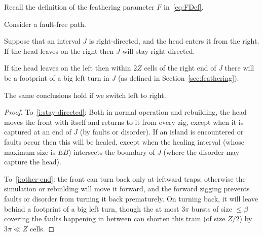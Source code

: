\documentclass[11pt]{memoir}
\theoremstyle{definition} %
\renewcommand{\le}{\leq}
\def\B{B}
\newcommand{\E}{E} %
\newcommand{\F}{F}
\newcommand{\passno}{\pi}
\newcommand{\Z}{Z} %
\begin{document}
Recall the definition of the feathering parameter \( \F \) in~\eqref{eq:FDef}.

\begin{lemma}\label{lem:keep-directed}
  Consider a fault-free path.
  \begin{alphenum}
  \item\label{i:stay-directed}
    Suppose that an interval \( J \) is right-directed, and the head enters it from the right.
    If the head leaves on the right then \( J \) will stay right-directed. 
  \item\label{i:other-end}  If the head leaves on the left then within \( 2\Z \) cells of the right end
    of \( J \) there will be a footprint of a big left turn in \( J \) (as defined in Section~\ref{sec:feathering}).
  \end{alphenum}
  The same conclusions hold if we switch left to right.
\end{lemma}
\begin{proof}
  To~\eqref{i:stay-directed}: Both in normal operation and rebuilding,
  the head moves the front with itself and returns to it from every zig, except when it is
  captured at an end of \( J \) (by faults or disorder).
  If an island is encountered or faults occur then this will be healed, except when the healing interval
  (whose maximum size is \( \E\B \)) intersects
  the boundary of \( J \) (where the disorder may capture the head).

  To~\eqref{i:other-end}: the front can turn back only at leftward traps;
  otherwise the simulation or rebuilding will move it forward, and the forward
  zigging prevents faults or disorder from turning it back prematurely.
  On turning back, it will leave behind a footprint of a big left turn,
  though the at most \( 3\passno \) bursts of size \( \le\beta \) covering the faults 
  happening in between can shorten this train (of size \( \Z/2 \))
  by \( 3\passno\ll\Z \) cells.

\end{proof}
\end{document}
